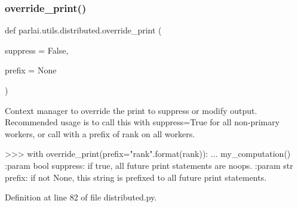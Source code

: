 \subsubsection{\texorpdfstring{override\+\_\+print()}{override\_print()}}
{\footnotesize\ttfamily def parlai.\+utils.\+distributed.\+override\+\_\+print (\begin{DoxyParamCaption}\item[{}]{suppress = {\ttfamily False},  }\item[{}]{prefix = {\ttfamily None} }\end{DoxyParamCaption})}

\begin{DoxyVerb}Context manager to override the print to suppress or modify output. Recommended
usage is to call this with suppress=True for all non-primary workers, or call with a
prefix of rank on all workers.

>>> with override_print(prefix="rank{}".format(rank)):
...     my_computation()
:param bool suppress:
    if true, all future print statements are noops.
:param str prefix:
    if not None, this string is prefixed to all future print statements.
\end{DoxyVerb}
 

Definition at line 82 of file distributed.\+py.


